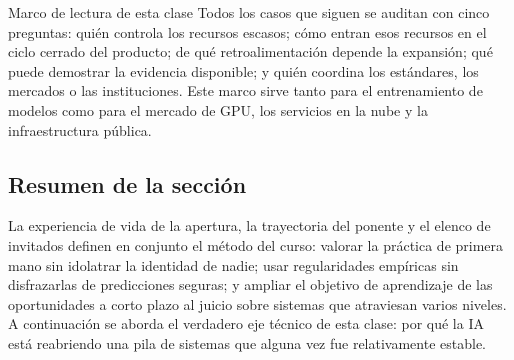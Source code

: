 \begin{importantbox}{Marco de lectura de esta clase}
Todos los casos que siguen se auditan con cinco preguntas: quién controla los recursos escasos; cómo entran esos recursos en el ciclo cerrado del producto; de qué retroalimentación depende la expansión; qué puede demostrar la evidencia disponible; y quién coordina los estándares, los mercados o las instituciones. Este marco sirve tanto para el entrenamiento de modelos como para el mercado de GPU, los servicios en la nube y la infraestructura pública.
\end{importantbox}

\subsection{Resumen de la sección}

La experiencia de vida de la apertura, la trayectoria del ponente y el elenco de invitados definen en conjunto el método del curso: valorar la práctica de primera mano sin idolatrar la identidad de nadie; usar regularidades empíricas sin disfrazarlas de predicciones seguras; y ampliar el objetivo de aprendizaje de las oportunidades a corto plazo al juicio sobre sistemas que atraviesan varios niveles. A continuación se aborda el verdadero eje técnico de esta clase: por qué la IA está reabriendo una pila de sistemas que alguna vez fue relativamente estable.
